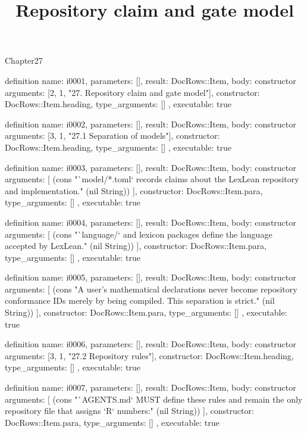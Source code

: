 \begin{lexlean}{Chapter27}
\title{Repository claim and gate model}
\begin{semanticmodule}
definition{
  name: i0001,
  parameters: [],
  result: DocRows::Item,
  body: constructor{
    arguments: [2, 1, "27. Repository claim and gate model"],
    constructor: DocRows::Item.heading,
    type_arguments: []
  },
  executable: true
}

definition{
  name: i0002,
  parameters: [],
  result: DocRows::Item,
  body: constructor{
    arguments: [3, 1, "27.1 Separation of models"],
    constructor: DocRows::Item.heading,
    type_arguments: []
  },
  executable: true
}

definition{
  name: i0003,
  parameters: [],
  result: DocRows::Item,
  body: constructor{
    arguments: [
      (cons "`model/*.toml` records claims about the LexLean repository and implementation." (nil String))
    ],
    constructor: DocRows::Item.para,
    type_arguments: []
  },
  executable: true
}

definition{
  name: i0004,
  parameters: [],
  result: DocRows::Item,
  body: constructor{
    arguments: [
      (cons "`language/` and lexicon packages define the language accepted by LexLean." (nil String))
    ],
    constructor: DocRows::Item.para,
    type_arguments: []
  },
  executable: true
}

definition{
  name: i0005,
  parameters: [],
  result: DocRows::Item,
  body: constructor{
    arguments: [
      (cons "A user's mathematical declarations never become repository conformance IDs merely by being compiled. This separation is strict." (nil String))
    ],
    constructor: DocRows::Item.para,
    type_arguments: []
  },
  executable: true
}

definition{
  name: i0006,
  parameters: [],
  result: DocRows::Item,
  body: constructor{
    arguments: [3, 1, "27.2 Repository rules"],
    constructor: DocRows::Item.heading,
    type_arguments: []
  },
  executable: true
}

definition{
  name: i0007,
  parameters: [],
  result: DocRows::Item,
  body: constructor{
    arguments: [
      (cons "`AGENTS.md` MUST define these rules and remain the only repository file that assigns `R` numbers:" (nil String))
    ],
    constructor: DocRows::Item.para,
    type_arguments: []
  },
  executable: true
}


\end{semanticmodule}
\end{lexlean}
